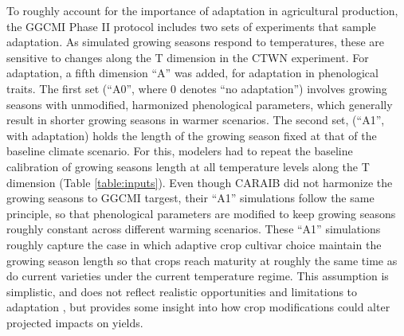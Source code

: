 \documentclass[gmd, manuscript]{copernicus} %
\begin{document}
To roughly account for the importance of adaptation in agricultural production, the GGCMI Phase II protocol includes two sets of experiments that sample adaptation. 
As simulated growing seasons respond to temperatures, these are sensitive to changes along the T dimension in the CTWN experiment. For adaptation, a fifth dimension ``A'' was added, for adaptation in phenological traits.
The first set (``A0'', where 0 denotes ``no adaptation'') involves growing seasons with unmodified, harmonized phenological parameters, which generally result in shorter growing seasons in warmer scenarios. 
The second set, (``A1'', with adaptation) holds the length of the growing season fixed at that of the baseline climate scenario. 
For this, modelers had to repeat the baseline calibration of growing seasons length at all temperature levels along the T dimension (Table \ref{table:inputs}).
Even though CARAIB did not harmonize the growing seasons to GGCMI targest, their ``A1'' simulations follow the same principle, so that phenological parameters are modified to keep growing seasons roughly constant across different warming scenarios.
These ``A1'' simulations roughly capture the case in which adaptive crop cultivar choice maintain the growing season length so that crops reach maturity at roughly the same time as do current varieties under the current temperature regime. 
This assumption is simplistic, and does not reflect realistic opportunities and limitations to adaptation \citep{vadez2012adaptation,challinor2018improving}, but provides some insight into how crop modifications could alter projected impacts on yields.
\end{document}
